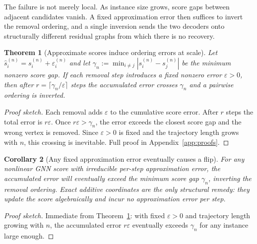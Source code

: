 \documentclass[11pt]{article}
\theoremstyle{plain}
\newtheorem{theorem}{Theorem}[section]
\newtheorem{corollary}[theorem]{Corollary}
\theoremstyle{remark}
\begin{document}
The failure is not merely local. As instance size grows, score gaps between adjacent
candidates vanish. A fixed approximation error then suffices to invert the removal
ordering, and a single inversion sends the two decoders onto structurally different
residual graphs from which there is no recovery.









\begin{theorem}[Approximate scores induce ordering errors at scale]
  \label{thm:approx_flip}
  Let $\hat{s}_i^{(n)} = s_i^{(n)} + \varepsilon_i^{(n)}$ and let $\gamma_n :=
  \min_{i\neq j}|s_i^{(n)} - s_j^{(n)}|$ be the minimum nonzero score gap. If
  each removal step introduces a fixed nonzero error $\varepsilon > 0$, then after
  $r = \lceil \gamma_n / \varepsilon \rceil$ steps the accumulated error crosses
  $\gamma_n$ and a pairwise ordering is inverted.
\end{theorem}
\begin{proof}[Proof sketch]
  Each removal adds $\varepsilon$ to the cumulative score error. After $r$ steps
  the total error is $r\varepsilon$. Once $r\varepsilon > \gamma_n$, the error
  exceeds the closest score gap and the wrong vertex is removed. Since $\varepsilon
  > 0$ is fixed and the trajectory length grows with $n$, this crossing is
  inevitable. Full proof in Appendix~\ref{app:proofs}.
\end{proof}

\begin{corollary}[Any fixed approximation error eventually causes a flip]
  \label{cor:vanishing_margin}
  For any nonlinear GNN score with irreducible per-step approximation error,
  the accumulated error will eventually exceed the minimum score gap $\gamma_n$,
  inverting the removal ordering. Exact additive coordinates are the only
  structural remedy: they update the score algebraically and incur no approximation
  error per step.
\end{corollary}
\begin{proof}[Proof sketch]
  Immediate from Theorem~\ref{thm:approx_flip}: with fixed $\varepsilon > 0$ and
  trajectory length growing with $n$, the accumulated error $r\varepsilon$
  eventually exceeds $\gamma_n$ for any instance large enough.
\end{proof}
\end{document}
